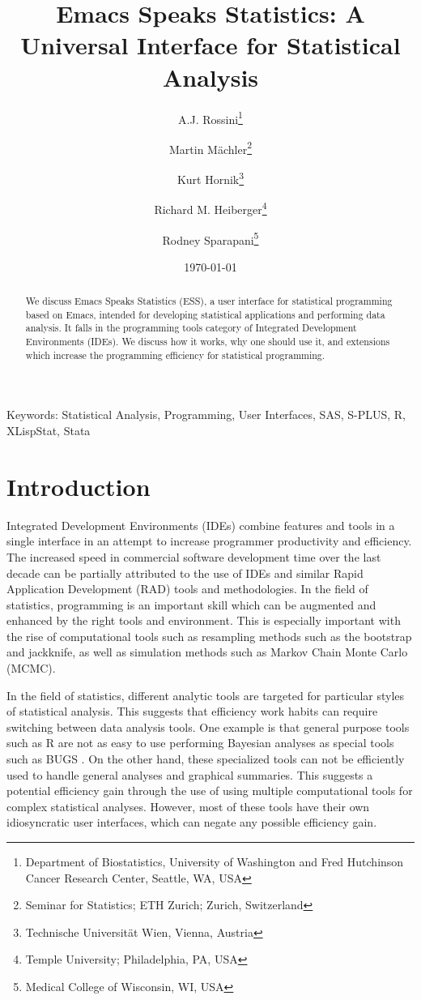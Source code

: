 \documentclass{article}
\title{Emacs Speaks Statistics: A Universal Interface for
  Statistical Analysis}
\author{A.J. Rossini\footnote{Department of Biostatistics, University
    of Washington and Fred Hutchinson Cancer Research Center, Seattle,
    WA, USA} \and Martin M{\"a}chler\footnote{Seminar for Statistics;
    ETH Zurich; Zurich, Switzerland} \and Kurt
  Hornik\footnote{Technische Universit{\"a}t Wien, Vienna, Austria}
  \and Richard M. Heiberger\footnote{Temple University; Philadelphia,
    PA, USA} \and Rodney Sparapani\footnote{Medical College of
    Wisconsin, WI, USA}}
\date{\today}
\newif\ifpdf
\begin{document}
\ifpdf
  \DeclareGraphicsExtensions{.jpg,.pdf,.png,.mps}
\fi


\maketitle

Keywords: Statistical Analysis, Programming, User Interfaces, SAS,
S-PLUS, R, XLispStat, Stata

\begin{abstract}
  We discuss Emacs Speaks Statistics (ESS), a user interface for
  statistical programming based on Emacs, intended for developing
  statistical applications and performing data analysis.  It falls in
  the programming tools category of Integrated Development
  Environments (IDEs).  We discuss how it works, why one should use
  it, and extensions which increase the programming efficiency for
  statistical programming.
\end{abstract}

\section{Introduction}
\label{sec:intro}

Integrated Development Environments (IDEs) combine features and tools
in a single interface in an attempt to increase programmer
productivity and efficiency.  The increased speed in commercial
software development time over the last decade can be partially
attributed to the use of IDEs and similar Rapid Application
Development (RAD) tools and methodologies.  In the field of
statistics, programming is an important skill which can be augmented
and enhanced by the right tools and environment.  This is especially
important with the rise of computational tools such as resampling
methods such as the bootstrap and jackknife, as well as simulation
methods such as Markov Chain Monte Carlo (MCMC).

In the field of statistics, different analytic tools are targeted for
particular styles of statistical analysis.  This suggests that
efficiency work habits can require switching between data analysis
tools.  One example is that general purpose tools such as R
\citep{ihak:gent:1996} are not as easy to use performing Bayesian
analyses as special tools such as BUGS \citep{SpieThomBest:1999}.  On
the other hand, these specialized tools can not be efficiently used to
handle general analyses and graphical summaries.  This suggests a
potential efficiency gain through the use of using multiple
computational tools for complex statistical analyses.  However, most
of these tools have their own idiosyncratic user interfaces, which can
negate any possible efficiency gain.
\end{document}
